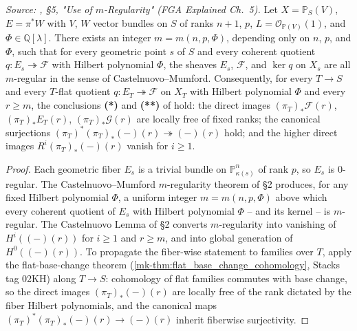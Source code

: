 \begin{lemma}
  \label{mk-lem:quot_boundedness}

  \textit{Source: \cite{nitsure-hilbert-quot}, \S 5, "Use of \(m\)-Regularity" (FGA Explained
  Ch.~5).}
  Let \(X = \mathbb{P}_S(V)\), \(E = \pi^* W\) with \(V\), \(W\) vector bundles on
  \(S\) of ranks \(n+1\), \(p\), \(L = \mathcal{O}_{\mathbb{P}(V)}(1)\), and
  \(\Phi \in \mathbb{Q}[\lambda]\). There exists an integer
  \(m = m(n, p, \Phi)\), depending only on \(n\), \(p\), and \(\Phi\), such that
  for every geometric point \(s\) of \(S\) and every coherent quotient
  \(q : E_s \twoheadrightarrow \mathcal{F}\) with Hilbert polynomial
  \(\Phi\), the sheaves \(E_s\), \(\mathcal{F}\), and \(\ker q\) on \(X_s\) are all
  \(m\)-regular in the sense of Castelnuovo--Mumford. Consequently, for
  every \(T \to S\) and every \(T\)-flat quotient
  \(q : E_T \twoheadrightarrow \mathcal{F}\) on \(X_T\) with Hilbert
  polynomial \(\Phi\) and every \(r \ge m\), the conclusions \textbf{(*)} and
  \textbf{(**)} of \cite[\S 5, ``Use of \(m\)-Regularity'']{nitsure-hilbert-quot}
  hold: the direct images \((\pi_T)_* \mathcal{F}(r)\), \((\pi_T)_* E_T(r)\),
  \((\pi_T)_* \mathcal{G}(r)\) are locally free of fixed ranks; the
  canonical surjections \((\pi_T)^* (\pi_T)_*(-)(r) \twoheadrightarrow (-)(r)\)
  hold; and the higher direct images \(R^i (\pi_T)_* (-)(r)\) vanish for
  \(i \ge 1\).
\end{lemma}
\begin{proof}

  Each geometric fiber \(E_s\) is a trivial bundle on \(\mathbb{P}^n_{\kappa(s)}\)
  of rank \(p\), so \(E_s\) is \(0\)-regular. The Castelnuovo--Mumford
  \(m\)-regularity theorem of \cite{nitsure-hilbert-quot} \S 2 produces, for any fixed Hilbert
  polynomial \(\Phi\), a uniform integer \(m = m(n, p, \Phi)\) above which
  every coherent quotient of \(E_s\) with Hilbert polynomial \(\Phi\) -- and
  its kernel -- is \(m\)-regular. The Castelnuovo Lemma of \cite{nitsure-hilbert-quot} \S 2
  converts \(m\)-regularity into vanishing of \(H^i((-) (r))\) for \(i \ge 1\)
  and \(r \ge m\), and into global generation of \(H^0((-)(r))\). To
  propagate the fiber-wise statement to families over \(T\), apply the
  flat-base-change theorem (\ref{mk-thm:flat_base_change_cohomology}, Stacks
  tag 02KH) along \(T \to S\): cohomology of flat families commutes with
  base change, so the direct images \((\pi_T)_*(-)(r)\) are locally free of
  the rank dictated by the fiber Hilbert polynomials, and the canonical
  maps \((\pi_T)^* (\pi_T)_*(-)(r) \to (-)(r)\) inherit fiberwise
  surjectivity.
\end{proof}

